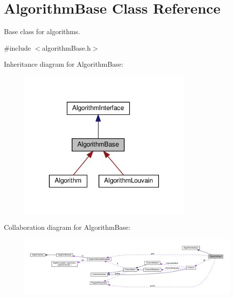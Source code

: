 \hypertarget{classAlgorithmBase}{}\section{Algorithm\+Base Class Reference}
\label{classAlgorithmBase}


Base class for algorithms.  




{\ttfamily \#include $<$algorithm\+Base.\+h$>$}



Inheritance diagram for Algorithm\+Base\+:
\nopagebreak
\begin{figure}[H]
\begin{center}
\leavevmode
\includegraphics[width=248pt]{classAlgorithmBase__inherit__graph}
\end{center}
\end{figure}


Collaboration diagram for Algorithm\+Base\+:
\nopagebreak
\begin{figure}[H]
\begin{center}
\leavevmode
\includegraphics[width=350pt]{classAlgorithmBase__coll__graph}
\end{center}
\end{figure}
